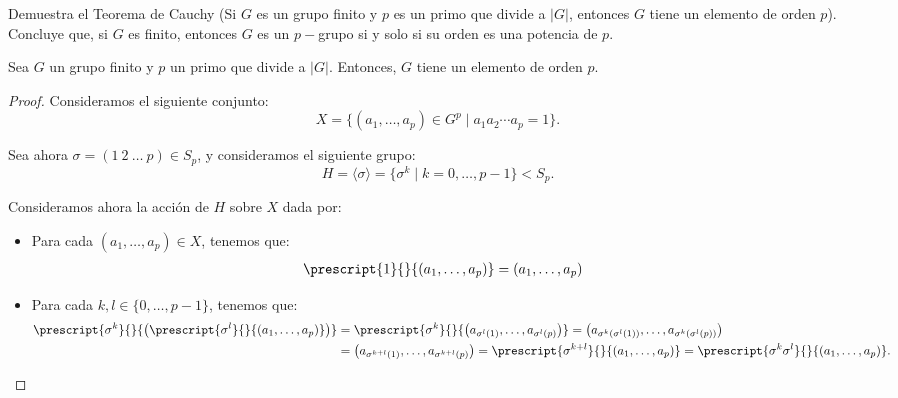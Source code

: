 \newpage
\begin{ejercicio}
    Demuestra el Teorema de Cauchy (Si \(G\) es un grupo finito y \(p\) es un primo que divide a \(|G|\), entonces \(G\) tiene un elemento de orden \(p\)). Concluye que, si \(G\) es finito, entonces \(G\) es un \(p-\)grupo si y solo si su orden es una potencia de \(p\).
    \begin{teo}[de Cauchy]
        Sea \(G\) un grupo finito y \(p\) un primo que divide a \(|G|\). Entonces, \(G\) tiene un elemento de orden \(p\).
        \begin{proof}
            Consideramos el siguiente conjunto:
            \begin{equation*}
                X = \{(a_1,\dots, a_p)\in G^p \mid a_1 a_2\cdots a_p = 1\}.
            \end{equation*}

            Sea ahora $\sigma=(1\ 2\ \ldots\ p)\in S_p$, y consideramos el siguiente grupo:
            \begin{equation*}
                H = \langle \sigma \rangle = \{\sigma^k \mid k = 0, \ldots, p-1\} < S_p.
            \end{equation*}

            Consideramos ahora la acción de \(H\) sobre \(X\) dada por:
            \begin{itemize}
                \item Para cada $(a_1,\dots, a_p)\in X$, tenemos que:
                \begin{align*}
                    \prescript{1}{}{(a_1,\dots, a_p)} &= (a_1,\dots, a_p)
                \end{align*}
                \item Para cada \(k, l\in \{0, \ldots, p-1\}\), tenemos que:
                \begin{align*}
                    \prescript{\sigma^k}{}{\left(\prescript{\sigma^l}{}{(a_1,\dots, a_p)}\right)}
                    &= \prescript{\sigma^k}{}{\left(a_{\sigma^l(1)},\dots, a_{\sigma^l(p)}\right)}
                    = \left(a_{\sigma^k(\sigma^l(1))},\dots, a_{\sigma^k(\sigma^l(p))}\right) \\
                    &= \left(a_{\sigma^{k+l}(1)},\dots, a_{\sigma^{k+l}(p)}\right)
                    = \prescript{\sigma^{k+l}}{}{(a_1,\dots, a_p)}
                    = \prescript{\sigma^k\sigma^l}{}{(a_1,\dots, a_p)}.
                \end{align*}
            \end{itemize}


\end{proof}
\end{teo}
\end{ejercicio}
